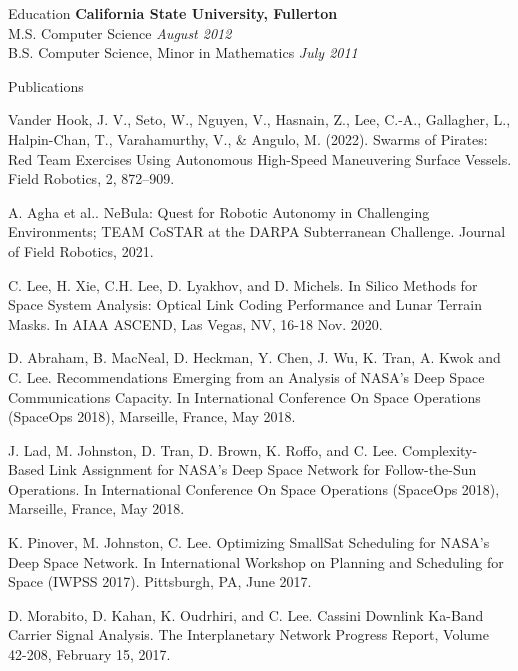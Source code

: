 \documentclass{resume} %
\begin{document}
\begin{rSection}{Education}
{\bf California State University, Fullerton}  \\ 
M.S. Computer Science \hfill {\em August 2012}\\
B.S. Computer Science, Minor in Mathematics  \hfill {\em July 2011}\\
\end{rSection}


\begin{rSection}{Publications}
\item Vander Hook, J. V., Seto, W., Nguyen, V., Hasnain, Z., Lee, C.-A., Gallagher,
L., Halpin-Chan, T., Varahamurthy, V., \& Angulo, M. (2022). Swarms of Pirates: Red Team Exercises Using
Autonomous High-Speed Maneuvering Surface Vessels. Field Robotics, 2, 872–909.

\item A. Agha et al.. NeBula: Quest for Robotic Autonomy in Challenging Environments; TEAM CoSTAR at the DARPA Subterranean Challenge. Journal of Field Robotics, 2021.

\item C. Lee, H. Xie, C.H. Lee, D. Lyakhov, and D. Michels. In Silico Methods for Space System Analysis: Optical Link Coding Performance and Lunar Terrain Masks. In AIAA ASCEND, Las Vegas, NV, 16-18 Nov. 2020.

\item D. Abraham, B. MacNeal, D. Heckman, Y. Chen, J. Wu, K. Tran, A. Kwok and C. Lee. Recommendations Emerging from an Analysis of NASA’s Deep Space Communications Capacity. In International Conference On Space Operations (SpaceOps 2018), Marseille, France, May 2018. 


\item J. Lad, M. Johnston, D. Tran, D. Brown, K. Roffo, and C. Lee. Complexity-Based Link Assignment for NASA’s Deep Space Network for Follow-the-Sun Operations. In International Conference On Space Operations (SpaceOps 2018), Marseille, France, May 2018. 

\item K. Pinover, M. Johnston, C. Lee. Optimizing SmallSat Scheduling for NASA’s Deep Space Network. In International Workshop on Planning and Scheduling for Space (IWPSS 2017). Pittsburgh, PA, June 2017. 


\item D. Morabito, D. Kahan, K. Oudrhiri, and C. Lee. Cassini Downlink Ka-Band Carrier Signal Analysis. The Interplanetary Network Progress Report, Volume 42-208, February 15, 2017. 



\end{rSection}
\end{document}
